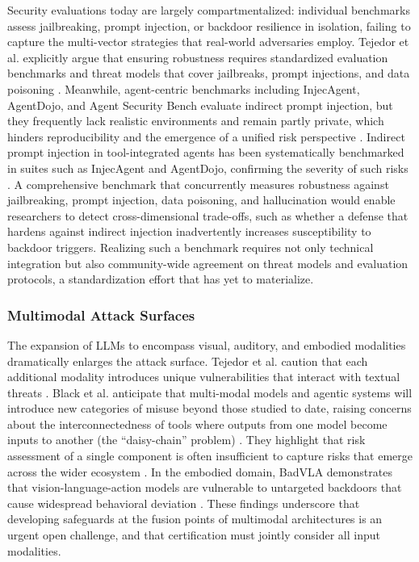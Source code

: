\documentclass[11pt,a4paper]{article}
\begin{document}
Security evaluations today are largely compartmentalized: individual benchmarks assess jailbreaking, prompt injection, or backdoor resilience in isolation, failing to capture the multi-vector strategies that real-world adversaries employ. Tejedor et al. explicitly argue that ensuring robustness requires standardized evaluation benchmarks and threat models that cover jailbreaks, prompt injections, and data poisoning \cite{Tejedor_2025_Elena_a76e13c1}. Meanwhile, agent-centric benchmarks including InjecAgent, AgentDojo, and Agent Security Bench evaluate indirect prompt injection, but they frequently lack realistic environments and remain partly private, which hinders reproducibility and the emergence of a unified risk perspective \cite{Zhang_2025_AI_647785c1}. Indirect prompt injection in tool-integrated agents has been systematically benchmarked in suites such as InjecAgent and AgentDojo, confirming the severity of such risks \cite{Jia_2025_LLM_604891e2}. A comprehensive benchmark that concurrently measures robustness against jailbreaking, prompt injection, data poisoning, and hallucination would enable researchers to detect cross-dimensional trade-offs, such as whether a defense that hardens against indirect injection inadvertently increases susceptibility to backdoor triggers. Realizing such a benchmark requires not only technical integration but also community-wide agreement on threat models and evaluation protocols, a standardization effort that has yet to materialize.

\subsubsection{Multimodal Attack Surfaces}

The expansion of LLMs to encompass visual, auditory, and embodied modalities dramatically enlarges the attack surface. Tejedor et al. caution that each additional modality introduces unique vulnerabilities that interact with textual threats \cite{Tejedor_2025_Elena_a76e13c1}. Black et al. anticipate that multi-modal models and agentic systems will introduce new categories of misuse beyond those studied to date, raising concerns about the interconnectedness of tools where outputs from one model become inputs to another (the ``daisy-chain'' problem) \cite{Black_2025_Open_488df73e}. They highlight that risk assessment of a single component is often insufficient to capture risks that emerge across the wider ecosystem \cite{Black_2025_Open_488df73e}. In the embodied domain, BadVLA demonstrates that vision-language-action models are vulnerable to untargeted backdoors that cause widespread behavioral deviation \cite{Zhou_2025_Badvla_37c2f4ff}. These findings underscore that developing safeguards at the fusion points of multimodal architectures is an urgent open challenge, and that certification must jointly consider all input modalities.
\end{document}
